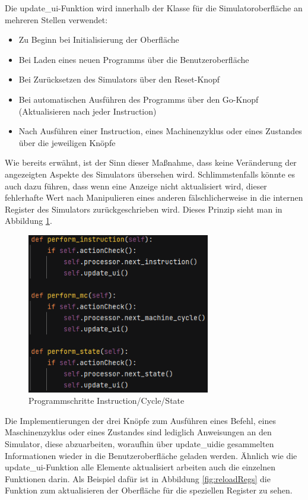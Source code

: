 \documentclass[12pt]{article}
\newcommand{\imgSpaceBefore}{\vspace{10pt}}
\begin{document}
\noindent
Die \glqq update\_ui\grqq-Funktion wird innerhalb der Klasse für die Simulatoroberfläche an mehreren Stellen verwendet:\imgSpaceBefore

\begin{itemize}
	\item Zu Beginn bei Initialisierung der Oberfläche
	\item Bei Laden eines neuen Programms über die Benutzeroberfläche
	\item Bei Zurücksetzen des Simulators über den Reset-Knopf
	\item Bei automatischen Ausführen des Programms über den Go-Knopf (Aktualisieren nach jeder Instruction)
	\item Nach Ausführen einer Instruction, eines Machinenzyklus oder eines Zustandes über die jeweiligen Knöpfe
\end{itemize}

\noindent
Wie bereits erwähnt, ist der Sinn dieser Maßnahme, dass keine Veränderung der angezeigten Aspekte des Simulators übersehen wird. Schlimmstenfalls könnte es auch dazu führen, dass wenn eine Anzeige nicht aktualisiert wird, dieser fehlerhafte Wert nach Manipulieren eines anderen fälschlicherweise in die internen Register des Simulators zurückgeschrieben wird. Dieses Prinzip sieht man in Abbildung \ref{fig:perf}.\imgSpaceBefore

\begin{figure}[H]
\centering
\includegraphics[width=8cm]{bilder/Perform}
\caption{Programmschritte Instruction/Cycle/State}
\label{fig:perf}
\end{figure}

\noindent
Die Implementierungen der drei Knöpfe zum Ausführen eines Befehl, eines Maschinenzyklus oder eines Zustandes sind lediglich Anweisungen an den Simulator, diese abzuarbeiten, woraufhin über \glqq update\_ui\grqq die gesammelten Informationen wieder in die Benutzeroberfläche geladen werden. Ähnlich wie die \glqq update\_ui\grqq-Funktion alle Elemente aktualisiert arbeiten auch die einzelnen Funktionen darin. Als Beispiel dafür ist in Abbildung \ref{fig:reloadRegs} die Funktion zum aktualisieren der Oberfläche für die speziellen Register zu sehen.\imgSpaceBefore
\end{document}
